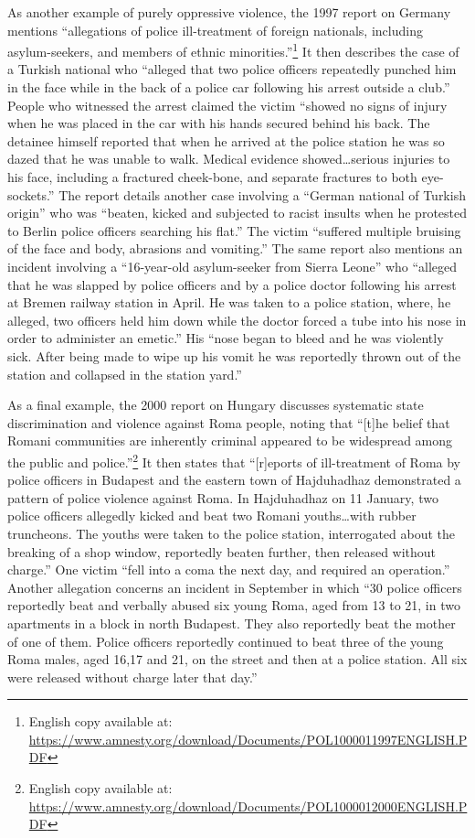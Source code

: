 \documentclass[11pt]{article}
\begin{document}
As another example of purely oppressive violence, the 1997 report on Germany mentions ``allegations of police ill-treatment of foreign nationals, including asylum-seekers, and members of ethnic minorities.''\footnote{English copy available at: \url{https://www.amnesty.org/download/Documents/POL1000011997ENGLISH.PDF}} It then describes the case of a Turkish national who ``alleged that two police officers repeatedly punched him in the face while in the back of a police car following his arrest outside a club.'' People who witnessed the arrest claimed the victim ``showed no signs of injury when he was placed in the car with his hands secured behind his back. The detainee himself reported that when he arrived at the police station he was so dazed that he was unable to walk. Medical evidence showed\ldots  serious injuries to his face, including a fractured cheek-bone, and separate fractures to both eye-sockets.'' The report details another case involving a ``German national of Turkish origin'' who was  ``beaten, kicked and subjected to racist insults when he protested to Berlin police officers searching his flat.'' The victim ``suffered multiple bruising of the face and body, abrasions and vomiting.'' The same report also mentions an incident involving a ``16-year-old asylum-seeker from Sierra Leone'' who ``alleged that he was slapped by police officers and by a police doctor following his arrest at Bremen railway station in April. He was taken to a police station, where, he alleged, two officers held him down while the doctor forced a tube into his nose in order to administer an emetic.'' His ``nose began to bleed and he was violently sick. After being made to wipe up his vomit he was reportedly thrown out of the station and collapsed in the station yard.'' 

As a final example, the 2000 report on Hungary discusses systematic state discrimination and violence against Roma people, noting that ``[t]he belief that Romani communities are inherently criminal appeared to be widespread among the public and police.''\footnote{English copy available at: \url{https://www.amnesty.org/download/Documents/POL1000012000ENGLISH.PDF}} It then states that ``[r]eports of ill-treatment of Roma by police officers in Budapest and the eastern town of Hajduhadhaz demonstrated a pattern of police violence against Roma. In Hajduhadhaz on 11 January, two police officers allegedly kicked and beat two Romani youths\ldots with rubber truncheons. The youths were taken to the police station, interrogated about the breaking of a shop window, reportedly beaten further, then released without charge.'' One victim ``fell into a coma the next day, and required an operation.'' Another allegation concerns an incident in September in which ``30 police officers reportedly beat and verbally abused six young Roma, aged from 13 to 21, in two apartments in a block in north Budapest. They also reportedly beat the mother of one of them. Police officers reportedly continued to beat three of the young Roma males, aged 16,17 and 21, on the street and then at a police station. All six were released without charge later that day.'' 
\end{document}
